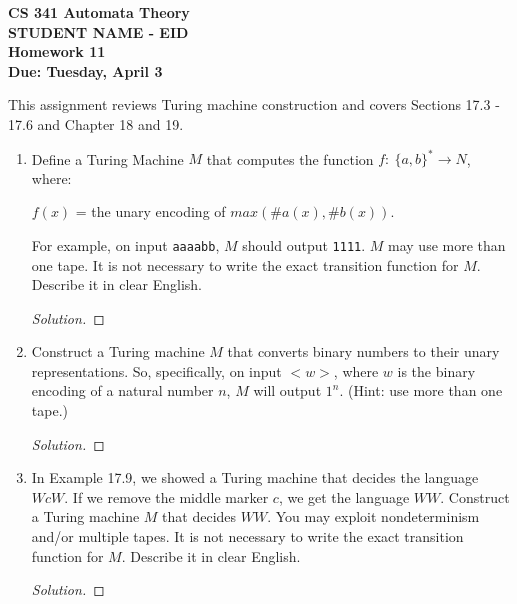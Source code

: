 \documentclass[10pt]{article}
\begin{document}
\begin{flushleft}
\textbf{\noindent
CS 341 Automata Theory \\
STUDENT NAME - EID \\
Homework 11 \\
Due: Tuesday, April 3}\\
\end{flushleft}
\noindent
This assignment reviews Turing machine construction and covers Sections 17.3 - 17.6 and Chapter 18 and 19. \\

\begin{enumerate}[1)]


\item
Define a Turing Machine $M$ that computes the function $f:\ \{a, b\}^* \rightarrow N$, where:\\
\begin{center}
$f(x)$ = the unary encoding of $max(\#a(x), \#b(x))$.  
\end{center}
For example, on input \texttt{aaaabb}, $M$ should output \texttt{1111}.  $M$ may use more than one tape.  It is not necessary to 
write the exact transition function for $M$.  Describe it in clear English.
\begin{proof}[Solution]
\end{proof}


\item
Construct a Turing machine $M$ that converts binary numbers to their unary representations.  So, specifically, on 
input $<w>$, where $w$ is the binary encoding of a natural number $n$, $M$ will output $1^n$.  (Hint: use more than one tape.)
\begin{proof}[Solution]
\end{proof}


\item
In Example 17.9, we showed a Turing machine that decides the language $WcW$.  If we remove the middle 
marker $c$, we get the language $WW$.  Construct a Turing machine $M$ that decides $WW$.  You may exploit 
nondeterminism and/or multiple tapes.  It is not necessary to write the exact transition function for $M$.  Describe 
it in clear English.
\begin{proof}[Solution]
\end{proof}




\end{enumerate}
\end{document}
